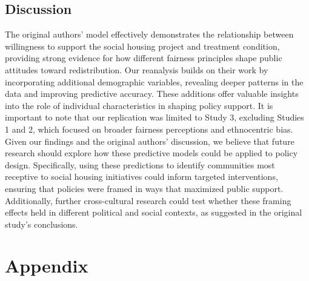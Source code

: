 \documentclass[titlepage]{article}
\begin{document}
\subsection{Discussion}
The original authors’ model effectively demonstrates the relationship between willingness to support the social housing project and treatment condition, providing strong evidence for how different fairness principles shape public attitudes toward redistribution. Our reanalysis builds on their work by incorporating additional demographic variables, revealing deeper patterns in the data and improving predictive accuracy. These additions offer valuable insights into the role of individual characteristics in shaping policy support. It is important to note that our replication was limited to Study 3, excluding Studies 1 and 2, which focused on broader fairness perceptions and ethnocentric bias. Given our findings and the original authors’ discussion, we believe that future research should explore how these predictive models could be applied to policy design. Specifically, using these predictions to identify communities most receptive to social housing initiatives could inform targeted interventions, ensuring that policies were framed in ways that maximized public support. Additionally, further cross-cultural research could test whether these framing effects held in different political and social contexts, as suggested in the original study’s conclusions.

\newpage
\section{Appendix}
\end{document}
